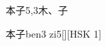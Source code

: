 \begin{entry}{本子}{5,3}{⽊、⼦}
  \begin{phonetics}{本子}{ben3 zi5}[][HSK 1]
  \end{phonetics}
\end{entry}
